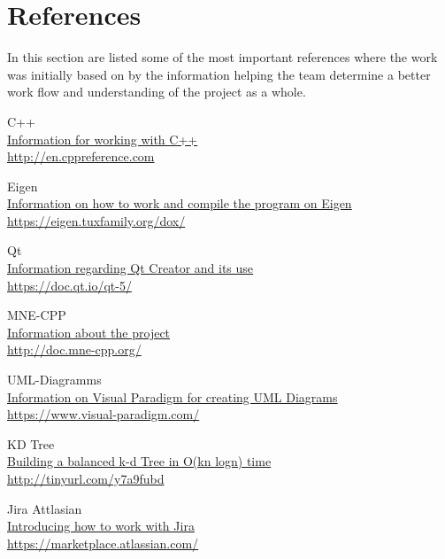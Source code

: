 \section{References}

In this section are listed some of the most important references where the work was initially based on by the information helping the team determine a better work flow and understanding of the project as a whole. 

\begin{aims}
	\item [C++] 
	\href{http://en.cppreference.com}{\\Information for working with C++}\\
		\url{http://en.cppreference.com}
	\item [Eigen] 
	\href{https://eigen.tuxfamily.org/dox/}{\\Information on how to work and compile the program on Eigen}
\\		\url{https://eigen.tuxfamily.org/dox/}
	\item [Qt] 
	\href{https://doc.qt.io/qt-5/}{\\Information regarding Qt Creator and its use}\\
		\url{https://doc.qt.io/qt-5/}
	\item [MNE-CPP]
	\href{http://doc.mne-cpp.org/}{\\Information about the project}\\
		\url{http://doc.mne-cpp.org/}
	\item [UML-Diagramms]
	\href{https://www.visual-paradigm.com/}{\\Information on Visual Paradigm for creating UML Diagrams}\\
		\url{https://www.visual-paradigm.com/}
	\item[KD Tree]
	\href{https://www.google.de/url?sa=t&source=web&rct=j&url=http://jcgt.org/published/0004/01/03/paper.pdf&ved=0ahUKEwjujpTLy-rUAhUQfFAKHT69BG8QFggfMAA&usg=AFQjCNGqWfqBlUcoTgtfbISsxhRz8E3GtA}{\\Building a balanced k-d Tree in O(kn logn) time}\\
	\url{http://tinyurl.com/y7a9fubd}
	\item [Jira Attlasian]
	\href{https://marketplace.atlassian.com/}{\\Introducing how to work with Jira}\\
	\url{https://marketplace.atlassian.com/}
	

	
\end{aims}